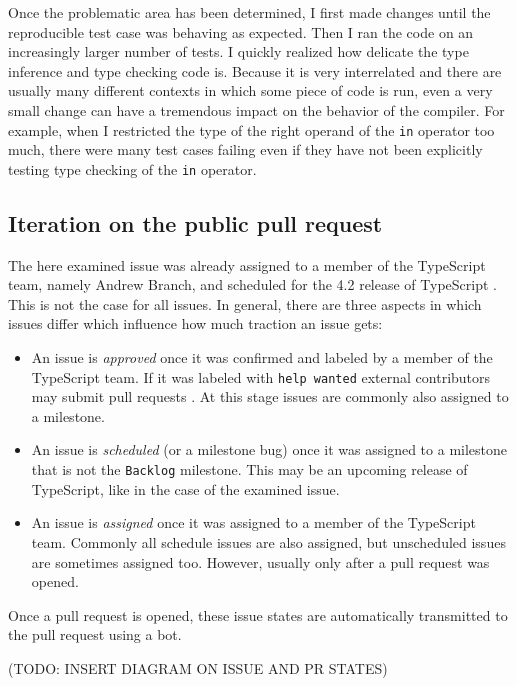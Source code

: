 \documentclass[12pt]{scrartcl}
\def\code#1{\texttt{\frenchspacing#1}}
\begin{document}
Once the problematic area has been determined, I first made changes until the reproducible test case was behaving as expected. Then I ran the code on an increasingly larger number of tests. I quickly realized how delicate the type inference and type checking code is. Because it is very interrelated and there are usually many different contexts in which some piece of code is run, even a very small change can have a tremendous impact on the behavior of the compiler. For example, when I restricted the type of the right operand of the \code{in} operator too much, there were many test cases failing even if they have not been explicitly testing type checking of the \code{in} operator.

\subsection{Iteration on the public pull request}

The here examined issue was already assigned to a member of the TypeScript team, namely Andrew Branch, and scheduled for the 4.2 release of TypeScript \cite{41317}. This is not the case for all issues. In general, there are three aspects in which issues differ which influence how much traction an issue gets:

\begin{itemize}
    \item An issue is \textit{approved} once it was confirmed and labeled by a member of the TypeScript team. If it was labeled with \code{help wanted} external contributors may submit pull requests \cite{ContributingGuidelines}. At this stage issues are commonly also assigned to a milestone.
    \item An issue is \textit{scheduled} (or a milestone bug) once it was assigned to a milestone that is not the \code{Backlog} milestone. This may be an upcoming release of TypeScript, like in the case of the examined issue.
    \item An issue is \textit{assigned} once it was assigned to a member of the TypeScript team. Commonly all schedule issues are also assigned, but unscheduled issues are sometimes assigned too. However, usually only after a pull request was opened.
\end{itemize}

Once a pull request is opened, these issue states are automatically transmitted to the pull request using a bot.

(TODO: INSERT DIAGRAM ON ISSUE AND PR STATES)
\end{document}

